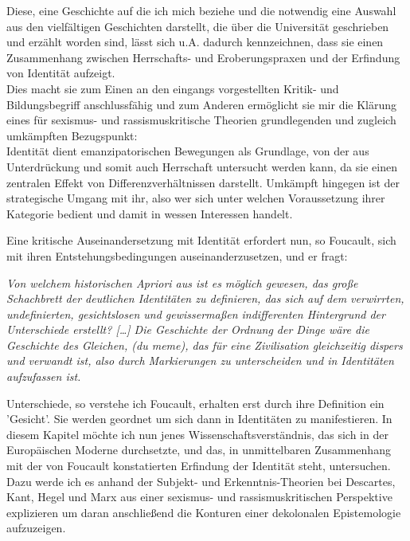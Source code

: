 Diese, eine Geschichte auf die ich mich beziehe und die notwendig eine Auswahl aus den vielfältigen Geschichten
darstellt, die über die Universität geschrieben und erzählt worden sind, lässt
sich u.A. dadurch kennzeichnen, dass sie einen Zusammenhang zwischen
Herrschafts- und Eroberungspraxen und der Erfindung von Identität aufzeigt. \\
Dies
macht sie zum Einen an den eingangs vorgestellten Kritik- und Bildungsbegriff
anschlussfähig und zum Anderen ermöglicht sie mir die Klärung eines für
sexismus- und rassismuskritische Theorien grundlegenden und zugleich umkämpften
Bezugspunkt: \\
Identität dient emanzipatorischen Bewegungen als Grundlage, von der
aus Unterdrückung und somit auch Herrschaft untersucht werden kann, da sie einen
zentralen Effekt von Differenzverhältnissen darstellt. Umkämpft hingegen ist der
strategische Umgang mit ihr, also wer sich unter welchen Voraussetzung ihrer
Kategorie bedient und damit in wessen Interessen handelt. 

Eine kritische
Auseinandersetzung mit Identität erfordert nun, so Foucault, sich mit ihren
Entstehungsbedingungen auseinanderzusetzen, und er fragt: 
\begin{myenv} \textit{
\glqq    Von welchem historischen Apriori aus ist es möglich gewesen, das große
    Schachbrett der deutlichen Identitäten zu definieren, das sich auf dem
    verwirrten, undefinierten, gesichtslosen und gewissermaßen indifferenten
    Hintergrund der Unterschiede erstellt? […] Die Geschichte der Ordnung der
    Dinge wäre die Geschichte des Gleichen, (du meme), das für eine Zivilisation
    gleichzeitig dispers und verwandt ist, also durch Markierungen zu
    unterscheiden und in Identitäten aufzufassen ist.\grqq \footnotemark
   }
\end{myenv}

Unterschiede, so verstehe ich Foucault, erhalten erst durch ihre Definition ein
'Gesicht'. Sie werden geordnet um sich dann in Identitäten zu manifestieren. In
diesem Kapitel möchte ich nun jenes Wissenschaftsverständnis, das sich in der
Europäischen Moderne durchsetzte, und das, in unmittelbaren Zusammenhang mit der
von Foucault konstatierten Erfindung der Identität steht, untersuchen. Dazu
werde ich es anhand der Subjekt- und Erkenntnis-Theorien bei Descartes, Kant,
Hegel und Marx aus einer sexismus- und rassismuskritischen Perspektive
explizieren um daran anschließend die Konturen einer dekolonalen Epistemologie
aufzuzeigen.
\\

